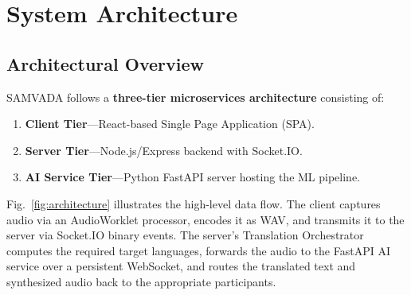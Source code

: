\documentclass[conference]{IEEEtran}
\begin{document}
\section{System Architecture}
\label{sec:architecture}

\subsection{Architectural Overview}

SAMVADA follows a \textbf{three-tier microservices architecture} consisting of:

\begin{enumerate}
  \item \textbf{Client Tier}---React-based Single Page Application (SPA).
  \item \textbf{Server Tier}---Node.js/Express backend with Socket.IO.
  \item \textbf{AI Service Tier}---Python FastAPI server hosting the ML pipeline.
\end{enumerate}

Fig.~\ref{fig:architecture} illustrates the high-level data flow. The client captures audio via an AudioWorklet processor, encodes it as WAV, and transmits it to the server via Socket.IO binary events. The server's Translation Orchestrator computes the required target languages, forwards the audio to the FastAPI AI service over a persistent WebSocket, and routes the translated text and synthesized audio back to the appropriate participants.
\end{document}
